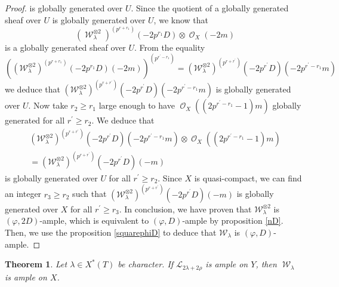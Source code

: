 \documentclass[11pt]{amsart}
\numberwithin{subsection}{section}
\numberwithin{figure}{section}
\numberwithin{table}{section}
\theoremstyle{1}
\newtheorem{theorem}{Theorem}[section]
\theoremstyle{2}
\DeclareMathOperator{\Oc}{\mathcal{O}}
\DeclareMathOperator{\W}{\mathcal{W}}
\begin{document}
\begin{proof}
is globally generated over $U$. Since the quotient of a globally generated sheaf over $U$ is globally generated over $U$, we know that
\begin{equation*}
 {(\W_{\lambda}^{\otimes 2})}^{(p^{r+r_1})}(-2p^{r_1}D) \otimes \Oc_X(-2m)
\end{equation*}
is a globally generated sheaf over $U$. From the equality
\begin{equation*}
{\left({(\mathcal{W}_{\lambda}^{\otimes 2})}^{(p^{r+r_1})}(-2p^{r_1}D)(-2m)\right)}^{(p^{r^\prime-r_1})} = {(\mathcal{W}_{\lambda}^{\otimes 2})}^{(p^{r+r^\prime})}(-2p^{r^\prime}D)(-2p^{r^{\prime}-r_1}m)
\end{equation*} 
we deduce that ${(\mathcal{W}_{\lambda}^{\otimes 2})}^{(p^{r+r^\prime})}(-2p^{r^\prime}D)(-2p^{r^{\prime}-r_1}m)$ is globally generated over $U$. Now take $r_2 \geq r_1$ large enough to have $\Oc_X((2p^{r^\prime-r_1}-1)m)$ globally generated for all $r^\prime \geq r_2$. We deduce that
\begin{multline*}
{(\mathcal{W}_{\lambda}^{\otimes 2})}^{(p^{r+r^\prime})}(-2p^{r^\prime}D)(-2p^{r^{\prime}-r_1}m) \otimes \Oc_X((2p^{r^\prime-r_1}-1)m) \\= {(\mathcal{W}_{\lambda}^{\otimes 2})}^{(p^{r+r^\prime})}(-2p^{r^\prime}D)(-m)
\end{multline*}
is globally generated over $U$ for all $r^\prime \geq r_2$. Since $X$ is quasi-compact, we can find an integer $r_3 \geq r_2$ such that ${(\mathcal{W}_{\lambda}^{\otimes 2})}^{(p^{r+r^\prime})}(-2p^{r^\prime}D)(-m)$ is globally generated over $X$ for all $r^\prime \geq r_3$. In conclusion, we have proven that $\mathcal{W}_{\lambda}^{\otimes 2}$ is $(\varphi,2D)$-ample, which is equivalent to $(\varphi,D)$-ample by proposition \ref{nD}. Then, we use the proposition \ref{squarephiD} to deduce that $\mathcal{W}_{\lambda}$ is $(\varphi,D)$-ample.
\end{proof}
\begin{theorem}\label{th1}
Let $\lambda \in X^*(T)$ be character. If $\mathcal{L}_{2\lambda+2\rho}$ is ample on $Y$, then $\W_{\lambda}$ is ample on $X$.
\end{theorem} 
\end{document}
